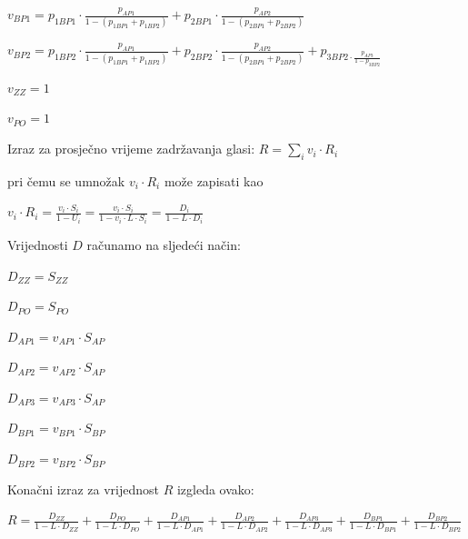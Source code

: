 \documentclass[11pt]{article}
\begin{document}
$v_{BP1} = p_{1BP1} \cdot \frac{p_{AP1}}{1 - (p_{1BP1} + p_{1BP2} )} + p_{2BP1} \cdot \frac{p_{AP2}}{1 - (p_{2BP1} + p_{2BP2})}$
\vspace{10px}

$v_{BP2} = p_{1BP2} \cdot \frac{p_{AP1}}{1 - (p_{1BP1} + p_{1BP2} )} + p_{2BP2} \cdot \frac{p_{AP2}}{1 - (p_{2BP1} + p_{2BP2})} + p_{3BP2 \cdot \frac{p_{AP3}}{1-p_{3BP2}}}$
\vspace{10px}

$v_{ZZ} = 1$
\vspace{10px}

$v_{PO} = 1$
\vspace{10px}

Izraz za prosječno vrijeme zadržavanja glasi:
$ R = \sum_{i} v_i \cdot R_i $
\vspace{10px}

pri čemu se umnožak $v_i \cdot R_i$ može zapisati kao

$v_i \cdot R_i = \frac{v_i \cdot S_i}{1 - U_i} = \frac{v_i \cdot S_i}{1 - v_i \cdot L \cdot S_i} = \frac{D_i}{1 - L \cdot D_i} $
\vspace{10px}

Vrijednosti $D$ računamo na sljedeći način:
\vspace{10px}

$D_{ZZ} = S_{ZZ}$
\vspace{10px}

$D_{PO} = S_{PO}$
\vspace{10px}

$D_{AP1} = v_{AP1} \cdot S_{AP}$
\vspace{10px}

$D_{AP2} = v_{AP2} \cdot S_{AP}$
\vspace{10px}

$D_{AP3} = v_{AP3} \cdot S_{AP}$
\vspace{10px}

$D_{BP1} = v_{BP1} \cdot S_{BP}$
\vspace{10px}

$D_{BP2} = v_{BP2} \cdot S_{BP}$
\vspace{10px}

Konačni izraz za vrijednost $R$ izgleda ovako:
\vspace{10px}

$R = \frac{D_{ZZ}}{1 - L \cdot D_{ZZ}} + \frac{D_{PO}}{1 - L \cdot D_{PO}} + \frac{D_{AP1}}{1 - L \cdot D_{AP1}} + \frac{D_{AP2}}{1 - L \cdot D_{AP2}} + \frac{D_{AP3}}{1 - L \cdot D_{AP3}} + \frac{D_{BP1}}{1 - L \cdot D_{BP1}} + \frac{D_{BP2}}{1 - L \cdot D_{BP2}} $
\end{document}
